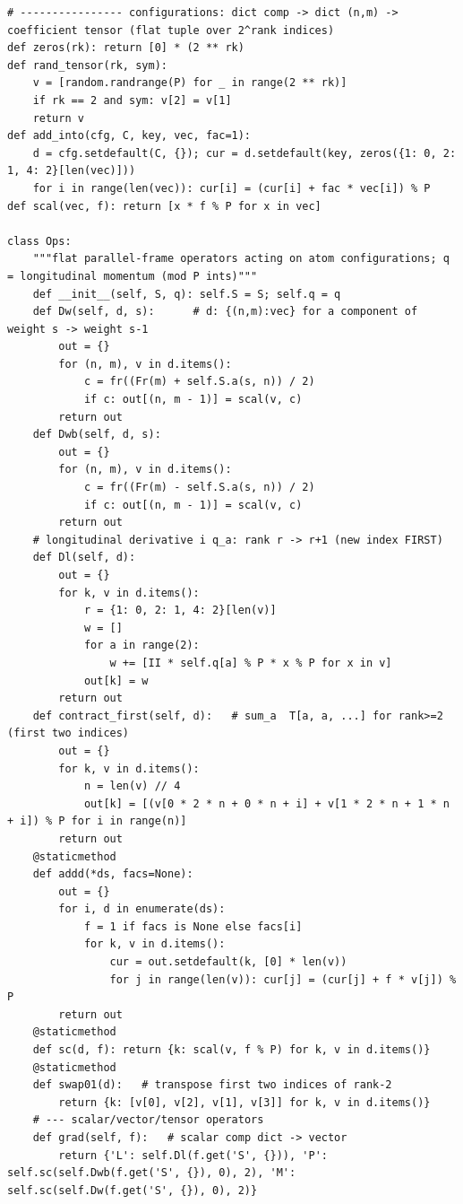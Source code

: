 \documentclass[10pt]{article}
\begin{document}
\begin{lstlisting}
# ---------------- configurations: dict comp -> dict (n,m) -> coefficient tensor (flat tuple over 2^rank indices)
def zeros(rk): return [0] * (2 ** rk)
def rand_tensor(rk, sym):
    v = [random.randrange(P) for _ in range(2 ** rk)]
    if rk == 2 and sym: v[2] = v[1]
    return v
def add_into(cfg, C, key, vec, fac=1):
    d = cfg.setdefault(C, {}); cur = d.setdefault(key, zeros({1: 0, 2: 1, 4: 2}[len(vec)]))
    for i in range(len(vec)): cur[i] = (cur[i] + fac * vec[i]) % P
def scal(vec, f): return [x * f % P for x in vec]

class Ops:
    """flat parallel-frame operators acting on atom configurations; q = longitudinal momentum (mod P ints)"""
    def __init__(self, S, q): self.S = S; self.q = q
    def Dw(self, d, s):      # d: {(n,m):vec} for a component of weight s -> weight s-1
        out = {}
        for (n, m), v in d.items():
            c = fr((Fr(m) + self.S.a(s, n)) / 2)
            if c: out[(n, m - 1)] = scal(v, c)
        return out
    def Dwb(self, d, s):
        out = {}
        for (n, m), v in d.items():
            c = fr((Fr(m) - self.S.a(s, n)) / 2)
            if c: out[(n, m - 1)] = scal(v, c)
        return out
    # longitudinal derivative i q_a: rank r -> r+1 (new index FIRST)
    def Dl(self, d):
        out = {}
        for k, v in d.items():
            r = {1: 0, 2: 1, 4: 2}[len(v)]
            w = []
            for a in range(2):
                w += [II * self.q[a] % P * x % P for x in v]
            out[k] = w
        return out
    def contract_first(self, d):   # sum_a  T[a, a, ...] for rank>=2 (first two indices)
        out = {}
        for k, v in d.items():
            n = len(v) // 4
            out[k] = [(v[0 * 2 * n + 0 * n + i] + v[1 * 2 * n + 1 * n + i]) % P for i in range(n)]
        return out
    @staticmethod
    def addd(*ds, facs=None):
        out = {}
        for i, d in enumerate(ds):
            f = 1 if facs is None else facs[i]
            for k, v in d.items():
                cur = out.setdefault(k, [0] * len(v))
                for j in range(len(v)): cur[j] = (cur[j] + f * v[j]) % P
        return out
    @staticmethod
    def sc(d, f): return {k: scal(v, f % P) for k, v in d.items()}
    @staticmethod
    def swap01(d):   # transpose first two indices of rank-2
        return {k: [v[0], v[2], v[1], v[3]] for k, v in d.items()}
    # --- scalar/vector/tensor operators
    def grad(self, f):   # scalar comp dict -> vector
        return {'L': self.Dl(f.get('S', {})), 'P': self.sc(self.Dwb(f.get('S', {}), 0), 2), 'M': self.sc(self.Dw(f.get('S', {}), 0), 2)}

\end{lstlisting}
\end{document}
